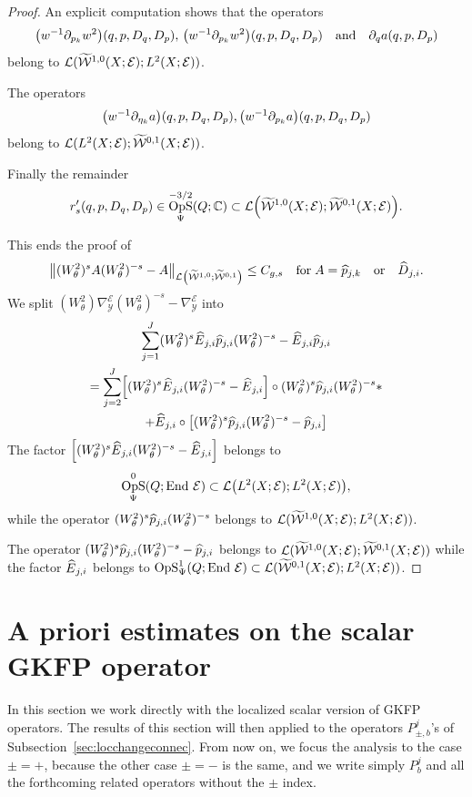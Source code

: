 \documentclass[AHL,Unicode,longabstracts]{cedram}
\newcommand{\C}{\mathbb{C}}
\newcommand{\clW}{\mathcal{W}}
\newcommand{\clY}{\mathcal{Y}}
\newcommand{\clE}{\mathcal{E}}
\newcommand{\clL}{\mathcal{L}}
\DeclareMathOperator{\End}{End}
\DeclareMathOperator{\OpS}{OpS}
\let\oldtilde\tilde
\renewcommand*{\tilde}[1]{\mathchoice{\widetilde{#1}}{\widetilde{#1}}{\oldtilde{#1}}{\oldtilde{#1}}}
\let\oldhat\hat
\renewcommand*{\hat}[1]{\mathchoice{\widehat{#1}}{\widehat{#1}}{\oldhat{#1}}{\oldhat{#1}}}
\let\originalleft\left
\let\originalright\right
\renewcommand{\left}{\mathopen{}\mathclose\bgroup\originalleft}
\renewcommand{\right}{\aftergroup\egroup\originalright}
\begin{document}
\begin{proof}
An explicit computation shows that the operators
\[
\left(w^{-1}\partial_{p_{k}}w^{2}\right)(q,p,D_{q},D_{p}),\, \left(w^{-1}\partial_{p_{k}}w^{2}\right)(q,p,D_{q},D_{p}) \quad\text{and}\quad \partial_{q}a(q,p,D_{p})
\]
belong to $\clL(\tilde{\clW}^{1,0}(X;\clE);L^{2}(X;\clE))$.

The operators
\[
\left(w^{-1}\partial_{\eta_{k}}a\right)(q,p,D_{q},D_{p}), \left(w^{-1}\partial_{p_{k}}a\right)(q,p,D_{q},D_{p})
\]
belong to $\clL(L^{2}(X;\clE);\tilde{\clW}^{0,1}(X;\clE))$.

Finally the remainder
\[
r_{s}'(q,p,D_{q},D_{p})\in \OpS^{-3/2}_{\Psi}(Q;\C)\subset \clL\left(\tilde{\clW}^{1,0}(X;\clE);\tilde{\clW}^{0,1}(X;\clE)\right).
\]

This ends the proof of
\[
\left\|(W^{2}_{\theta})^{s}A(W^{2}_{\theta})^{-s}-A\right\|_{\clL\left(\widetilde{\clW}^{1,0};\widetilde{\clW}^{0,1}\right)}\leq C_{g,s} \quad\text{for}\;A=\hat{p}_{j,k}\quad\text{or}\quad\hat{D}_{j,i}.
\]
We split $(W^{2}_{\theta})\nabla_{\clY}^{\clE}(W^{2}_{\theta})^{-s}-\nabla_{\clY}^{\clE}$ into
\begin{multline*}
\sum_{j=1}^{J}(W^{2}_{\theta})^{s}\hat{E}_{j,i}\hat{p}_{j,i}(W^{2}_{\theta})^{-s}-\hat{E}_{j,i}\hat{p}_{j,i}\\ =\sum_{j=2}^{J}\left[(W^{2}_{\theta})^{s}\hat{E}_{j,i}(W^{2}_{\theta})^{-s}-\hat{E}_{j,i}\right]\circ (W^{2}_{\theta})^{s}\hat{p}_{j,i}(W^{2}_{\theta})^{-s}*\\
+\hat{E}_{j,i}\circ \left[(W^{2}_{\theta})^{s}\hat{p}_{j,i}(W^{2}_{\theta})^{-s}-\hat{p}_{j,i}\right]
\end{multline*}
The factor $\left[(W^{2}_{\theta})^{s}\hat{E}_{j,i}(W^{2}_{\theta})^{-s}-\hat{E}_{j,i}\right]$ belongs to
\[
\OpS^{0}_{\Psi}(Q;\End\,\clE)\subset \clL\left(L^{2}(X;\clE);L^{2}(X;\clE)\right),
\]
while the operator $(W^{2}_{\theta})^{s}\hat{p}_{j,i}(W^{2}_{\theta})^{-s}$ belongs to $\clL(\tilde{\clW}^{1,0}(X;\clE);L^{2}(X;\clE))$.

The operator $(W^{2}_{\theta})^{s}\hat{p}_{j,i}(W^{2}_{\theta})^{-s}-\hat{p}_{j,i}$ belongs to $\clL(\tilde{\clW}^{1,0}(X;\clE);\tilde{\clW}^{0,1}(X;\clE))$ while the factor $\hat{E}_{j,i}$ belongs to $\OpS^{1}_{\Psi}(Q;\End\,\clE)\subset \clL(\tilde{\clW}^{0,1}(X;\clE);L^{2}(X;\clE))$.
\end{proof}
\section{A priori estimates on the scalar GKFP operator}\label{sec:localization}
In this section we work directly with the localized scalar version of GKFP operators. The results of this section will then applied to the operators $P_{\pm,b}^j$'s of Subsection~\ref{sec:locchangeconnec}. From now on, we focus the analysis to the case $\pm=+$, because the other case $\pm=-$ is the same, and we write simply $P_{b}^j$ and all the forthcoming related operators without the $\pm$ index.
\end{document}
